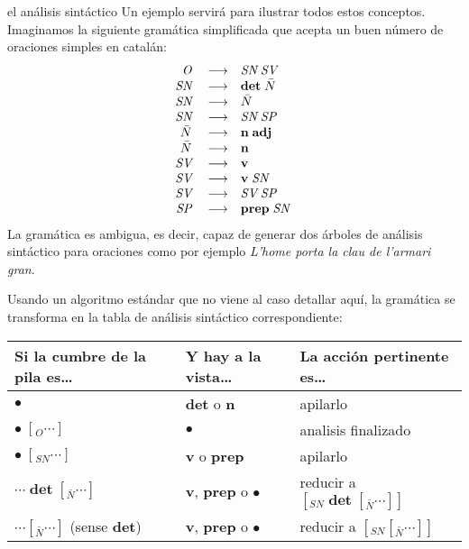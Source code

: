 \begin{persabermes}{el análisis sintáctico}
Un ejemplo servirá para ilustrar todos estos conceptos. Imaginamos la siguiente gramática simplificada que acepta un buen número de oraciones simples en catalán\label{pg:gramsenz}: $$ \begin{array}{rcl} \mbox{\em O}\; &\longrightarrow & \mbox{\em SN}\; \mbox{\em SV}\; \\ \mbox{\em SN}\; &\longrightarrow & \mbox{\bf det}\; \mbox{\em $\bar{N}$}\; \\ \mbox{\em SN}\; &\longrightarrow & \mbox{\em $\bar{N}$}\; \\ \mbox{\em SN}\; &\longrightarrow & \mbox{\em SN}\; \mbox{\em SP}\; \\ \mbox{\em $\bar{N}$}\; &\longrightarrow & \mbox{\bf n}\; \mbox{\bf adj}\; \\ \mbox{\em $\bar{N}$}\; &\longrightarrow & \mbox{\bf n}\; \\ \mbox{\em SV}\; &\longrightarrow & \mbox{\bf v}\; \\ \mbox{\em SV}\; &\longrightarrow & \mbox{\bf v}\; \mbox{\em SN}\; \\ \mbox{\em SV}\; &\longrightarrow & \mbox{\em SV}\; \mbox{\em SP}\; \\ \mbox{\em SP}\; &\longrightarrow & \mbox{\bf prep}\; \mbox{\em SN}\; \\ \end{array} $$ La gramática es ambigua, es decir, capaz de generar dos árboles de análisis sintáctico para oraciones como por ejemplo \emph{L'home porta la clau de l'armari gran}. 

Usando un algoritmo estándar que no viene al caso detallar aquí, la gramática se transforma en la tabla de análisis sintáctico correspondiente: 

\begin{center} \begin{tabular}{l|l|l} \hline

\textsf{Si la cumbre de la pila es\ldots} &\textsf{Y hay a la vista\ldots} &\textsf{La acción pertinente es\ldots} \\ \hline

$\bullet$ &\textbf{det} o \textbf{n} &apilarlo \\ \hline

$\bullet\; [_O \cdots ]$ &$\bullet$ &analisis finalizado \\ \hline $\bullet\; [_{SN} \cdots ]$ &\textbf{v} o \textbf{prep} &apilarlo \\ 

\hline

$\cdots\; \textbf{det} \; [_{\bar{N}} \cdots ]$ &\textbf{v}, \textbf{prep} o $\bullet$ &reducir a $[_{SN}\; \textbf{det}\;[_{\bar{N}} \cdots ] ]$ \\ \hline

$\cdots [_{\bar{N}} \cdots ]$ (sense \textbf{det}) &\textbf{v}, \textbf{prep} o $\bullet$ &reducir a $[_{SN} [_{\bar{N}} \cdots ] ]$ \\ 


\end{tabular}
\end{center}
\end{persabermes}
